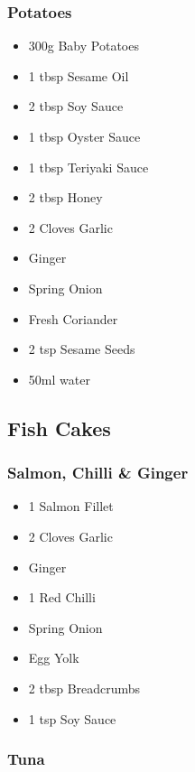 \documentclass[11pt, english]{article}
\begin{document}
		\subsubsection*{Potatoes}

	\begin{itemize}
        \setlength\itemsep{0cm}
                \item 300g Baby Potatoes
		\item 1 tbsp Sesame Oil
		\item 2 tbsp Soy Sauce
		\item 1 tbsp Oyster Sauce
		\item 1 tbsp Teriyaki Sauce
		\item 2 tbsp Honey
		\item 2 Cloves Garlic
		\item Ginger
		\item Spring Onion
		\item Fresh Coriander
		\item 2 tsp Sesame Seeds
		\item 50ml water
        \end{itemize}

\newpage
	
	\subsection{Fish Cakes}

		\subsubsection*{Salmon, Chilli \& Ginger}

	\begin{itemize}
        \setlength\itemsep{0cm}
                \item 1 Salmon Fillet
		\item 2 Cloves Garlic
		\item Ginger
		\item 1 Red Chilli
		\item Spring Onion
		\item Egg Yolk
		\item 2 tbsp Breadcrumbs
		\item 1 tsp Soy Sauce
        \end{itemize}

		\subsubsection*{Tuna}
\end{document}
